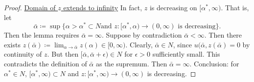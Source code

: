 \begin{lemma}
\begin{proof}
\underline{Domain of $z$ extends to infinity}
In fact, $z$ is decreasing on $[\alpha^*,\infty)$.
That is, let $$\bar\alpha\coloneqq\sup\{\alpha>\alpha^*\subset N\text{
and }z:[\alpha^*,\alpha)\to(0,\infty)\text{ is decreasing}\}.$$
Then the lemma requires $\bar\alpha=\infty$.
Suppose by contradiction $\bar\alpha<\infty$.
Then there exists $z(\bar\alpha)\coloneqq\lim_{\alpha\to\bar\alpha}z(\alpha)\in[0,\infty).$
Clearly, $\bar\alpha\in N$, since $u(\bar\alpha,z(\bar\alpha)=0$ by continuity of $z$.
But then $[\bar\alpha,\bar\alpha+\epsilon)\in N$ for $\epsilon>0$ sufficiently small.
This contradicts the definition of $\bar\alpha$ as the supremum.
Then $\bar\alpha=\infty$.
Conclusion: for $\alpha^*\in N$, $[\alpha^*,\infty)\subset N$
and $z:[\alpha^*,\infty)\to(0,\infty)$ is decreasing.

\end{proof}
\end{lemma}
